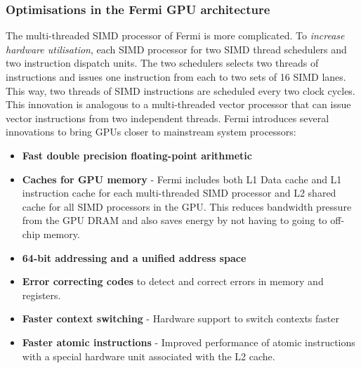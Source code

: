 \documentclass[11pt]{article}
\begin{document}
\subsubsection{Optimisations in the Fermi GPU architecture}
The multi-threaded SIMD processor of Fermi is more complicated. To \textit{increase hardware utilisation}, each SIMD processor for two SIMD thread schedulers and two instruction dispatch units. The two schedulers selects two threads of instructions and issues one instruction from each to two sets of 16 SIMD lanes. This way, two threads of SIMD instructions are scheduled every two clock cycles. This innovation is analogous to a multi-threaded vector processor that can issue vector instructions from two independent threads. 
\n
Fermi introduces several innovations to bring GPUs closer to mainstream system processors:
\begin{itemize}
\item \textbf{Fast double precision floating-point arithmetic}
\item \textbf{Caches for GPU memory} - Fermi includes both L1 Data cache and L1 instruction cache for each multi-threaded SIMD processor and L2 shared cache for all SIMD processors in the GPU. This reduces bandwidth pressure from the GPU DRAM and also saves energy by not having to going to off-chip memory. 
\item \textbf{64-bit addressing and a unified address space}
\item \textbf{Error correcting codes} to detect and correct errors in memory and registers.
\item \textbf{Faster context switching} - Hardware support to switch contexts faster
\item \textbf{Faster atomic instructions} - Improved performance of atomic instructions with a special hardware unit associated with the L2 cache. 
\end{itemize}
\end{document}
